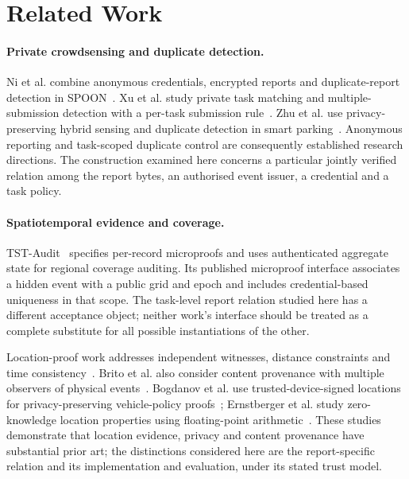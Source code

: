 \documentclass[pdflatex,iicol,sn-mathphys-num]{sn-jnl}
\begin{document}
\section{Related Work}
\paragraph{Private crowdsensing and duplicate detection.} Ni et al. combine anonymous credentials, encrypted reports and duplicate-report detection in SPOON~\citep{Ni2020SPOON}. Xu et al. study private task matching and multiple-submission detection with a per-task submission rule~\citep{Xu2021TaskMatching}. Zhu et al. use privacy-preserving hybrid sensing and duplicate detection in smart parking~\citep{Zhu2022HybridSensing}. Anonymous reporting and task-scoped duplicate control are consequently established research directions. The construction examined here concerns a particular jointly verified relation among the report bytes, an authorised event issuer, a credential and a task policy.

\paragraph{Spatiotemporal evidence and coverage.} TST-Audit~\citep{He2026TSTAudit} specifies per-record microproofs and uses authenticated aggregate state for regional coverage auditing. Its published microproof interface associates a hidden event with a public grid and epoch and includes credential-based uniqueness in that scope. The task-level report relation studied here has a different acceptance object; neither work's interface should be treated as a complete substitute for all possible instantiations of the other.

Location-proof work addresses independent witnesses, distance constraints and time consistency~\citep{Brito2025DecentralizedPoL}. Brito et al. also consider content provenance with multiple observers of physical events~\citep{Brito2026ContentProvenance}. Bogdanov et al. use trusted-device-signed locations for privacy-preserving vehicle-policy proofs~\citep{Bogdanov2025VehiclePolicy}; Ernstberger et al. study zero-knowledge location properties using floating-point arithmetic~\citep{Ernstberger2025ZKLP}. These studies demonstrate that location evidence, privacy and content provenance have substantial prior art; the distinctions considered here are the report-specific relation and its implementation and evaluation, under its stated trust model.
\end{document}
